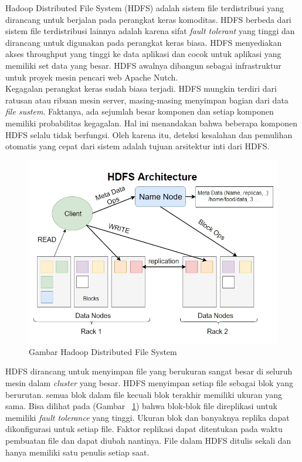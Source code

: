 \documentclass[a4paper,twoside]{article}
\begin{document}
\begin{enumerate}
Hadoop Distributed File System (HDFS) adalah sistem file terdistribusi yang dirancang untuk berjalan pada perangkat keras komoditas. HDFS berbeda dari sistem file terdistribusi lainnya adalah  karena sifat {\it fault tolerant} yang tinggi dan dirancang untuk digunakan pada perangkat keras biasa. HDFS menyediakan akses throughput yang tinggi ke data aplikasi dan cocok untuk aplikasi yang memiliki set data yang besar. HDFS awalnya dibangun sebagai infrastruktur untuk proyek mesin pencari web Apache Nutch.\\


Kegagalan perangkat keras sudah biasa terjadi. HDFS mungkin terdiri dari ratusan atau ribuan mesin server, masing-masing menyimpan bagian dari data {\it file sustem}. Faktanya, ada sejumlah besar komponen dan setiap komponen memiliki probabilitas kegagalan. Hal ini  menandakan bahwa beberapa komponen HDFS selalu tidak berfungsi. Oleh karena itu, deteksi kesalahan dan pemulihan otomatis yang cepat dari sistem adalah tujuan arsitektur inti dari HDFS.\\

\begin{figure}[H]
    \centering  
    \includegraphics[scale=0.6]{hdfs}  
    \caption[Gambar Hadoop Distributed File System]{Gambar Hadoop Distributed File System} 
    \label{fig:hdfs} 
\end{figure}


HDFS dirancang untuk menyimpan file yang berukuran sangat besar di seluruh mesin dalam {\it cluster} yang besar. HDFS menyimpan setiap file sebagai blok yang berurutan. semua blok dalam file kecuali blok terakhir memiliki ukuran yang sama. Bisa dilihat pada (Gambar ~\ref{fig:hdfs}) bahwa blok-blok file direplikasi untuk memiliki {\it fault tolerance} yang tinggi. Ukuran blok dan banyaknya replika dapat dikonfigurasi untuk setiap file. Faktor replikasi dapat ditentukan pada waktu pembuatan file dan dapat diubah nantinya. File dalam HDFS ditulis sekali dan hanya memiliki satu penulis setiap saat.\\


\end{enumerate}
\end{document}
